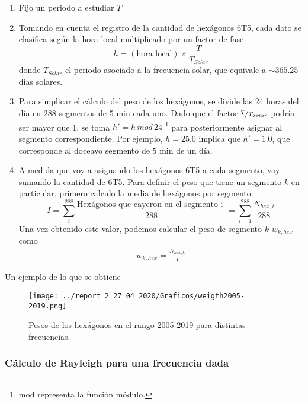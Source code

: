       \begin{enumerate}
        \item Fijo un periodo a estudiar $T$
        \item Tomando en cuenta el registro de la cantidad de hexágonos 6T5, cada dato se clasifica según la hora local multiplicado por un factor de fase
        \begin{equation*}
          h = (\text{hora local})\times \frac{T}{T_{Solar}}
        \end{equation*}
        donde $T_{Solar}$ el periodo asociado a la frecuencia solar, que equivale a $\sim 365.25$  días solares. %
        \item Para simplicar el cálculo del peso de los hexágonos, se divide las 24 horas del día en $288$ segmentos de 5 min cada uno. Dado que el factor $\nicefrac{T}{T_{Solar}}$ podría ser mayor que 1, se toma $h' = h\, mod \,24$ \footnote{mod representa la función módulo.} para posteriormente asignar al segmento correspondiente. Por ejemplo, $h=25.0$ implica que $h'= 1.0$, que corresponde al doceavo segmento de $5$ min de un día.

       \item A medida que voy a asignando los hexágonos 6T5 a cada segmento, voy sumando la cantidad de 6T5. Para definir el peso que tiene un segmento $k$ en particular, primero calculo la media de hexágonos por segmento:
       \begin{equation}
         I = \sum^{288}_i \frac{\text{Hexágonos que cayeron en el segmento  i }}{288} = \sum^{288}_{i=1} \frac{N_{hex, i}}{288}
       \end{equation}
       Una vez obtenido este valor, podemos calcular el peso de segmento $k$  $w_{k,hex}$  como
        \begin{align}
         w_{k,hex}= \frac{N_{hex, k}}{I}
         \end{align} 
      \end{enumerate}

      Un ejemplo de lo que se obtiene


        \begin{figure}[H]
          \centering
              \texttt{[image: ../report\_2\_27\_04\_2020/Graficos/weigth2005-2019.png]}
              \caption{Pesos de los hexágonos en el rango 2005-2019 para distintas frecuencias.}
        \end{figure}

  \subsubsection{Cálculo de Rayleigh para una frecuencia dada}

